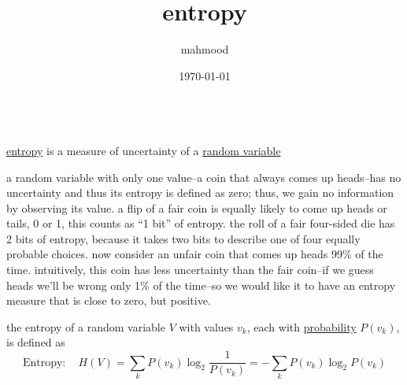 \documentclass[a4paper,12pt]{article}
\author{mahmood}
\date{\today}
\title{entropy}
\begin{document}
\maketitle
\cite{aima2010}\\
\href{20230227001825-entropy.org}{entropy} is a measure of uncertainty of a \href{20230104221353-random_variable.org}{random variable}\\
\begin{my_example}
a random variable with only one value--a coin that always comes up heads--has no uncertainty and thus its entropy is defined as zero; thus, we gain no information by observing its value. a flip of a fair coin is equally likely to come up heads or tails, 0 or 1, this counts as “1 bit” of entropy. the roll of a fair four-sided die has 2 bits of entropy, because it takes two bits to describe one of four equally probable choices. now consider an unfair coin that comes up heads 99\% of the time. intuitively, this coin has less uncertainty than the fair coin--if we guess heads we’ll be wrong only 1\% of the time--so we would like it to have an entropy measure that is close to zero, but positive.\\
\end{my_example}
\begin{lemma}
the entropy of a random variable \(V\) with values \(v_k\), each with \href{probability.org}{probability} \(P(v_k)\), is defined as\\
\[
\text{Entropy}: \quad H(V) = \sum_{k} P(v_k)\log_2\frac{1}{P(v_k)} = -\sum_{k} P(v_k)\log_2P(v_k)
\]\\
\end{lemma}
\end{document}
